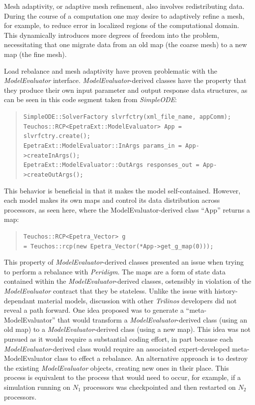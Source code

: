 \documentclass[pdf,ps2pdf,12pt,report]{SANDreport}
\theoremstyle{plain}
\theoremstyle{definition}
\theoremstyle{remark}
\numberwithin{equation}{section}
\begin{document}
Mesh adaptivity, or adaptive mesh refinement, also involves redistributing data. During the course of a computation one may desire to adaptively refine a mesh, for example, to reduce error in localized regions of the computational domain. This dynamically introduces more degrees of freedom into the problem, necessitating that one migrate data from an old map (the coarse mesh) to a new map (the fine mesh).

Load rebalance and mesh adaptivity have proven problematic with the \emph{ModelEvaluator} interface. \emph{ModelEvaluator}-derived classes have the property that they produce their own input parameter and output response data structures, as can be seen in this code segment taken from \emph{SimpleODE}:
\begin{quote}
\vspace{-5pt}
\verb"SimpleODE::SolverFactory slvrfctry(xml_file_name, appComm);"\\
\verb"Teuchos::RCP<EpetraExt::ModelEvaluator> App = slvrfctry.create();"\\
\verb"EpetraExt::ModelEvaluator::InArgs params_in = App->createInArgs();"\\
\verb"EpetraExt::ModelEvaluator::OutArgs responses_out = App->createOutArgs();"\\
\vspace{-17pt}
\end{quote}
This behavior is beneficial in that it makes the model self-contained. However, each model makes its own maps and control its data distribution across processors, as seen here, where the ModelEvaluator-derived class ``App'' returns a map:
\begin{quote}
\vspace{-5pt}
\verb"Teuchos::RCP<Epetra_Vector> g"\\
\verb"= Teuchos::rcp(new Epetra_Vector(*App->get_g_map(0)));"\\
\vspace{-17pt}
\end{quote}
This property of \emph{ModelEvaluator}-derived classes presented an issue when trying to perform a rebalance with \emph{Peridigm}. The maps are a form of state data contained within the \emph{ModelEvaluator}-derived classes, ostensibly in violation of the \emph{ModelEvaluator} contract that they be stateless. Unlike the issue with history-dependant material models, discussion with other \emph{Trilinos} developers did not reveal a path forward. One idea proposed was to generate a ``meta-ModelEvaluator'' that would transform a \emph{ModelEvaluator}-derived class (using an old map) to a \emph{ModelEvaluator}-derived class (using a new map). This idea was not pursued as it would require a substantial coding effort, in part because each \emph{ModelEvaluator}-derived class would require an associated expert-developed meta-ModelEvaluator class to effect a rebalance. An alternative approach is to destroy the existing \emph{ModelEvaluator} objects, creating new ones in their place. This process is equivalent to the process that would need to occur, for example, if a simulation running on $N_1$ processors was checkpointed and then restarted on $N_2$ processors.
\end{document}
